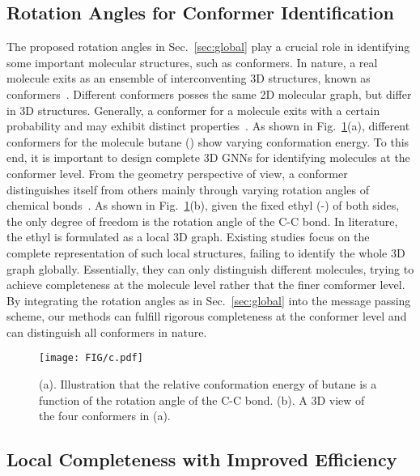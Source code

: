 \documentclass{article}
\begin{document}
\subsection{Rotation Angles for Conformer Identification}  \label{sec:glob_conformer}
The proposed rotation angles 
in Sec.~\ref{sec:global} play a crucial role
in identifying some important molecular structures, such as conformers.
In nature, a real molecule exits as an ensemble of interconventing 3D structures,
known as conformers~\citep{axelrod2022geom,axelrod2020molecular,ganea2021geomol}.
Different conformers posses the same 2D molecular graph, but differ in 3D structures.
Generally, a conformer for a molecule exits with a certain probability and may exhibit 
distinct properties~\citep{axelrod2022geom,axelrod2020molecular}.
As shown in Fig.~\ref{fig:conformer}(a),
different conformers for the molecule butane ()
show varying conformation energy.
To this end, it is important to design complete 3D GNNs for 
identifying molecules at the conformer level.
From the geometry perspective of view,
a conformer distinguishes itself from others mainly
through varying rotation angles of chemical bonds~\citep{ganea2021geomol}.
As shown in Fig.~\ref{fig:conformer}(b), 
given the fixed ethyl (-) of both sides, 
the only degree of freedom is the rotation angle of the C-C bond.
In literature, the ethyl is formulated as a local 3D graph. 
Existing studies focus on the complete representation of 
such local structures, failing to identify the whole 3D graph globally.
Essentially, they can only distinguish different molecules, trying to achieve
completeness at the molecule level rather that the finer comformer level.
By integrating the rotation angles as in Sec.~\ref{sec:global} into the message passing scheme,
our methods can fulfill rigorous completeness at the conformer level and can distinguish all conformers in nature.

\begin{figure}[t]
    \centering
    \texttt{[image: FIG/c.pdf]}
    \vspace{-8 pt}
    \caption{(a). Illustration that the relative conformation energy of butane is a function of the rotation angle of the C-C bond.
    (b). A 3D view of the four conformers in (a).
    }\label{fig:conformer}
    \vspace{-15 pt}
\end{figure}


\subsection{Local Completeness with Improved Efficiency} \label{sec:local}
\end{document}
